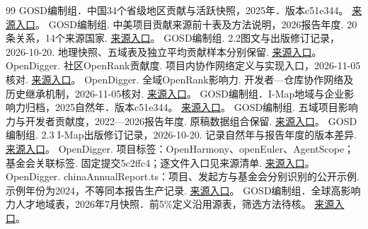 \documentclass[UTF8,fontset=none,11pt,a4paper]{ctexart}
\begin{document}
\begin{thebibliography}{99}
 GOSD编制组．中国34个省级地区贡献与活跃快照，2025年．版本c51e344。 \href{https://github.com/X-lab2017/2026-Global-Open-Source-Development-Report/blob/c51e3441361407b68f10b339d97eff288319b503/preview/content/cmap/provinces.csv}{来源入口}。
 GOSD编制组. 中美项目贡献来源前十表及方法说明，2026报告年度. 20条关系，14个来源国家. \href{https://github.com/X-lab2017/2026-Global-Open-Source-Development-Report/blob/c51e3441361407b68f10b339d97eff288319b503/preview/content/cmap/flow-method.md}{来源入口}。
 GOSD编制组. 2.2图文与出版修订记录，2026-10-20. 地理快照、五域表及独立平均贡献样本分别保留. \href{https://github.com/X-lab2017/2026-Global-Open-Source-Development-Report/blob/c51e3441361407b68f10b339d97eff288319b503/preview/docs/cmap-publication-revision-20261020.md}{来源入口}。
 OpenDigger. 社区OpenRank贡献度. 项目内协作网络定义与实现入口，2026-11-05核对. \href{https://open-digger.cn/docs/user-docs/metrics/community-openrank}{来源入口}。
 OpenDigger. 全域OpenRank影响力. 开发者—仓库协作网络及历史继承机制，2026-11-05核对. \href{https://open-digger.cn/docs/user-docs/metrics/global-openrank}{来源入口}。
 GOSD编制组．I-Map地域与企业影响力归档，2025自然年．版本c51e344。 \href{https://github.com/X-lab2017/2026-Global-Open-Source-Development-Report/blob/c51e3441361407b68f10b339d97eff288319b503/preview/content/imap/influence.json}{来源入口}。
 GOSD编制组. 五域项目影响力与开发者贡献度，2022—2026报告年度. 原稿数据组合保留. \href{https://github.com/X-lab2017/2026-Global-Open-Source-Development-Report/blob/c51e3441361407b68f10b339d97eff288319b503/preview/content/imap/observations.json}{来源入口}。
 GOSD编制组. 2.3 I-Map出版修订记录，2026-10-20. 记录自然年与报告年度的版本差异. \href{https://github.com/X-lab2017/2026-Global-Open-Source-Development-Report/blob/c51e3441361407b68f10b339d97eff288319b503/preview/docs/imap-publication-revision-20261020.md}{来源入口}。
 OpenDigger. 项目标签：OpenHarmony、openEuler、AgentScope；基金会关联标签. 固定提交5c2ffc4；逐文件入口见来源清单. \href{https://github.com/X-lab2017/open-digger/blob/5c2ffc4f5b3dd37ebcb20514c7abfee6853bd830/labeled_data/companies/huawei/openharmony.yml}{来源入口}。
 OpenDigger. chinaAnnualReport.ts：项目、发起方与基金会分别识别的公开示例. 示例年份为2024，不等同本报告生产记录. \href{https://github.com/X-lab2017/open-digger/blob/5c2ffc4f5b3dd37ebcb20514c7abfee6853bd830/src/dataProduction/chinaAnnualReport.ts}{来源入口}。
 GOSD编制组．全球高影响力人才地域表，2026年7月快照．前5\%定义沿用源表，筛选方法待核。 \href{https://github.com/X-lab2017/2026-Global-Open-Source-Development-Report/blob/c51e3441361407b68f10b339d97eff288319b503/preview/content/tmap/fig-2-4-1_global_open_source_talent_map.csv}{来源入口}。

\end{thebibliography}
\end{document}
